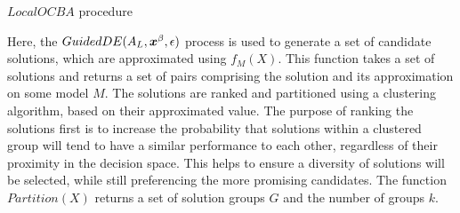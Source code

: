 \begin{algorithm}[h!] 
\caption{$LocalOCBA$ procedure}
\label{alg:local-ocba}
{\footnotesize
\begin{algorithmic}[1]
 
 
 
 
\label{while-loop}
   
   
   
   
   
\ENDWHILE
{} 
\end{algorithmic}
}
\end{algorithm}

Here, the $GuidedDE(A_L,\boldsymbol{x}^\beta,\epsilon)$ process is used to generate a set of candidate solutions, which are approximated using $f_M(X)$. This function takes a set of solutions and returns a set of pairs comprising the solution and its approximation on some model $M$. The solutions are ranked and partitioned using a clustering algorithm, based on their approximated value. The purpose of ranking the solutions first is to increase the probability that solutions within a clustered group will tend to have a similar performance to each other, regardless of their proximity in the decision space. This helps to ensure a diversity of solutions will be selected, while still preferencing the more promising candidates. The function $Partition(X)$ returns a set of solution groups $G$ and the number of groups $k$.

